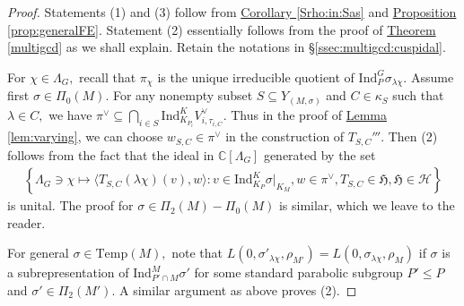 \documentclass[10pt]{amsart}
\theoremstyle{definition}
\numberwithin{equation}{section}
\numberwithin{equation}{subsection}
\newcommand{\Ind}{\mathrm{Ind}}
\newcommand{\CC}{\mathbb{C}}
\begin{document}
\begin{proof}
    Statements (1) and (3) follow from  \hyperref[Srho:in:Sas]{Corollary \ref{Srho:in:Sas}} and \hyperref[prop:generalFE]{Proposition \ref{prop:generalFE}}. Statement (2) essentially follows from the proof of \hyperref[multigcd]{Theorem \ref{multigcd}} as we shall explain. Retain the notations in \S \ref{ssec:multigcd:cuspidal}.

    For $\chi\in \Lambda_G,$ recall that $\pi_\chi$ is the unique irreducible quotient of $\mathrm{Ind}_P^G\sigma_{\lambda\chi}.$ Assume first $\sigma\in \Pi_0(M).$ For any nonempty subset $S\subseteq Y_{(M,\sigma)}$ and $C\in \kappa_S$ such that $\lambda\in C,$ we have $\pi^\lor\subseteq\bigcap_{i\in S} \mathrm{Ind}_{K_{P_i}}^K V_{i,\tau_{i,C}}^\lor.$ Thus in the proof of \hyperref[lem:varying]{Lemma \ref{lem:varying}}, we can choose $w_{S,C}\in \pi^\lor$ in the construction of $T_{S,C}'''.$  Then (2) follows from the fact that the ideal in $\CC[\Lambda_G]$ generated by the set
    \begin{align*}
    \left\{ \Lambda_G\ni \chi\mapsto \langle T_{S,C}(\lambda\chi)(v),w\rangle: v\in \Ind_{K_P}^K \sigma|_{K_M}, w\in \pi^\lor, T_{S,C}\in \mathfrak{H},  \mathfrak{H}\in \mathcal{H}\right\}
    \end{align*}
    is unital. The proof for $\sigma\in \Pi_2(M)-\Pi_0(M)$ is similar, which we leave to the reader.
   

    For general $\sigma\in \mathrm{Temp}(M),$ note that $L(0,\sigma'_{\lambda\chi},\rho_{M'})=L(0,\sigma_{\lambda\chi},\rho_{M})$ if $\sigma$ is a subrepresentation of $\Ind_{P'\cap M}^M\sigma'$ for some standard parabolic subgroup $P'\le P$ and $\sigma'\in \Pi_2(M').$ A similar argument as above proves (2). 
\end{proof}

\end{document}
